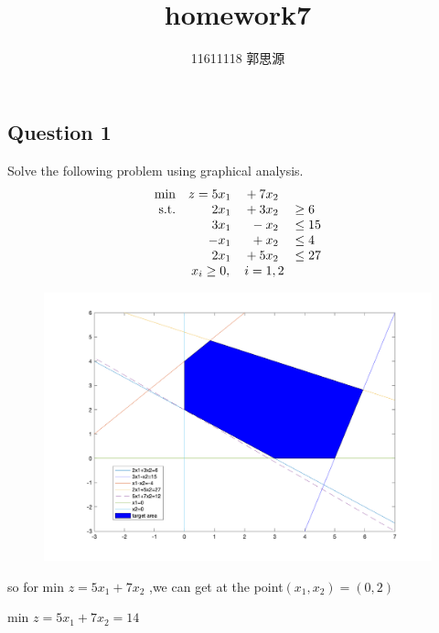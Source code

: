 \documentclass[12pt,a4paper]{article}
\begin{document}
 
\title{homework7}
	\author{11611118 郭思源}  

\begin{spacing}{1.5}%
\section{Question 1}
        Solve the following problem using graphical analysis.
        \[
            \begin{array}{rrrl}
                \min        &  z = 5x_1 &{} + 7x_2        \\
                \text{s.t.} &      2x_1 &{} + 3x_2 &{} \geq 6  \\
                            &      3x_1 &{} -  x_2 &{} \leq 15 \\
                            &      -x_1 &{} +  x_2 &{} \leq 4  \\
                            &      2x_1 &{} + 5x_2 &{} \leq 27 \\
                \multicolumn{4}{c}{x_i\geq 0,\quad i=1,2}
            \end{array}
        \]
\begin{figure}[htbp]
	\centering
	\includegraphics[scale=0.25]{HW7.png}	
\end{figure}

so for min $z=5x_1 +7x_2$ ,we can get at the point$(x_1,x_2)=(0,2)$ 

min $z=5x_1 +7x_2=14$

\end{spacing}
\end{document}
